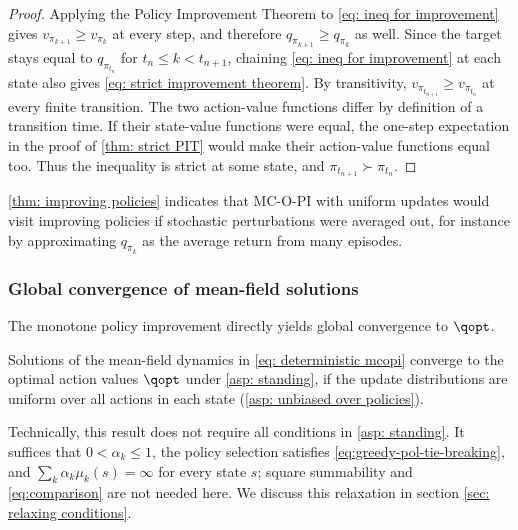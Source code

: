 \begin{proof}
Applying the Policy Improvement Theorem to \eqref{eq: ineq for improvement} gives $v_{\pi_{k+1}}\ge v_{\pi_k}$ at every step, and therefore $q_{\pi_{k+1}}\ge q_{\pi_k}$ as well.
Since the target stays equal to $q_{\pi_{t_n}}$ for $t_n\le k<t_{n+1}$, chaining \eqref{eq: ineq for improvement} at each state also gives \eqref{eq: strict improvement theorem}.
By transitivity, $v_{\pi_{t_{n+1}}}\ge v_{\pi_{t_n}}$ at every finite transition. The two action-value functions differ by definition of a transition time. If their state-value functions were equal, the one-step expectation in the proof of \autoref{thm: strict PIT} would make their action-value functions equal too. Thus the inequality is strict at some state, and $\pi_{t_{n+1}}\succ\pi_{t_n}$.
\end{proof}

\autoref{thm: improving policies} indicates that
MC-O-PI with uniform updates would visit improving policies
if stochastic perturbations were averaged out, for instance by approximating $q_{\pi_k}$ as the average return from many episodes.

\subsubsection{Global convergence of mean-field solutions}

The monotone policy improvement directly yields global convergence to $\qopt$.

\begin{proposition}
\label{thm: convergence deterministic mcopi}
    Solutions of the mean-field dynamics in \eqref{eq: deterministic mcopi} converge to the optimal action values $\qopt$
    under \autoref{asp: standing},
    if the update distributions are uniform over all actions in each state (\autoref{asp: unbiased over policies}).
\end{proposition}

Technically, this result does not require all conditions in \autoref{asp: standing}. It suffices that $0<\alpha_k\le1$, the policy selection satisfies \eqref{eq:greedy-pol-tie-breaking}, and $\sum_k\alpha_k\mu_k(s)=\infty$ for every state $s$; square summability and \eqref{eq:comparison} are not needed here. We discuss this relaxation in section \ref{sec: relaxing conditions}.
